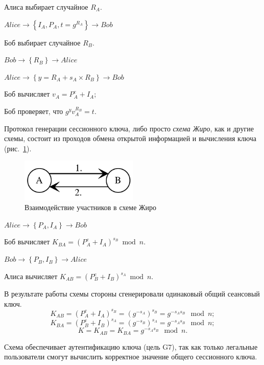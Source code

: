 \begin{protocol}
    \item[(1)] Алиса выбирает случайное $R_A$.
    \item[{}] $Alice \to \left\{ I_A, P_A, t = g^{R_A} \right\} \to Bob$
    \item[(2)] Боб выбирает случайное $R_B$.
    \item[{}] $Bob \to \left\{ R_B \right\} \to Alice$
    \item[(3)] $Alice \to \left\{ y = R_A + s_A \times R_B \right\} \to Bob$
    \item[(4)] Боб вычисляет $v_A = P_A^e + I_A$;
    \item[{}] Боб проверяет, что $g^ y v_A^{R_B} = t$.
\end{protocol}

Протокол генерации сессионного ключа, либо просто \emph{схема Жиро}, как и другие схемы, состоит из проходов обмена открытой информацией и вычисления ключа (рис.~\ref{fig:key_distribution-girault-scheme}).

\begin{figure}
    \centering
    \includegraphics[width=0.5\textwidth]{pic/key_distribution-girault-scheme}
    \caption{Взаимодействие участников в схеме Жиро\label{fig:key_distribution-girault-scheme}}
\end{figure}

\begin{protocol}
    \item[(1)] $Alice \to \left\{ P_A, I_A \right\} \to Bob$
    \item[(2)] Боб вычисляет $K_{BA} = (P_A^e + I_A)^{s_B} \bmod n$.
    \item[{}] $Bob \to \left\{ P_B, I_B \right\} \to Alice$
    \item[(3)] Алиса вычисляет $K_{AB} = (P_B^e + I_B)^{s_A} \bmod n$.
\end{protocol}

В результате работы схемы стороны сгенерировали одинаковый общий сеансовый ключ.
\[ K_{AB} = (P_A^e + I_A)^{s_B} = (g^{-s_A})^{s_B} = g^{-s_As_B} \mod n; \]
\[ K_{BA} = (P_B^e + I_B)^{s_A} = (g^{-s_B})^{s_A} = g^{-s_As_B} \mod n; \]
            \[ K = K_{AB} = K_{BA} = g^{-s_As_B} \mod n. \]

Схема обеспечивает аутентификацию ключа (цель G7), так как только легальные пользователи смогут вычислить корректное значение общего сессионного ключа.

